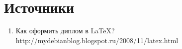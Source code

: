 \newpage

\chapter*{Источники}

\begin{enumerate}
\item Как оформить диплом в LaTeX? http://mydebianblog.blogspot.ru/2008/11/latex.html
\end{enumerate}